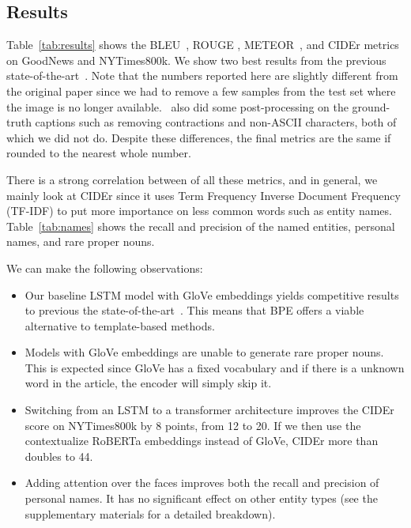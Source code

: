 \subsection{Results}


Table~\ref{tab:results} shows the BLEU~\cite{Papineni2002Bleu}, ROUGE
\cite{Lin2004ROUGE}, METEOR~\cite{Denkowski2014Meteor}, and CIDEr
\cite{Vedantam2015CIDEr} metrics on GoodNews and NYTimes800k. We show two best
results from the previous state-of-the-art~\cite{Biten2019GoodNews}. Note that
the numbers reported here are slightly different from the original paper since
we had to remove a few samples from the test set where the image is no longer
available.~\cite{Biten2019GoodNews} also did some post-processing on the
ground-truth captions such as removing contractions and non-ASCII characters,
both of which we did not do. Despite these differences, the final metrics
are the same if rounded to the nearest whole number.

There is a strong correlation between of all these metrics, and in general, we
mainly look at CIDEr since it uses Term Frequency Inverse Document Frequency
(TF-IDF) to put more importance on less common words such as entity names.
Table~\ref{tab:names} shows the recall and precision of the named entities,
personal names, and rare proper nouns.

We can make the following observations:

\begin{itemize}
   \item Our baseline LSTM model with GloVe embeddings yields competitive
   results to previous the state-of-the-art~\cite{Biten2019GoodNews}. This
   means that BPE offers a viable alternative to template-based methods.

   \item Models with GloVe embeddings are unable to generate rare proper nouns.
   This is expected since GloVe has a fixed vocabulary and if there is a
   unknown word in the article, the encoder will simply skip it.

   \item Switching from an LSTM to a transformer architecture improves the
   CIDEr score on NYTimes800k by 8 points, from 12 to 20. If we then use the
   contextualize RoBERTa embeddings instead of GloVe, CIDEr more than doubles
   to 44.

   \item Adding attention over the faces improves both the recall and precision
   of personal names. It has no significant effect on other entity types (see
   the supplementary materials for a detailed breakdown).
\end{itemize}


